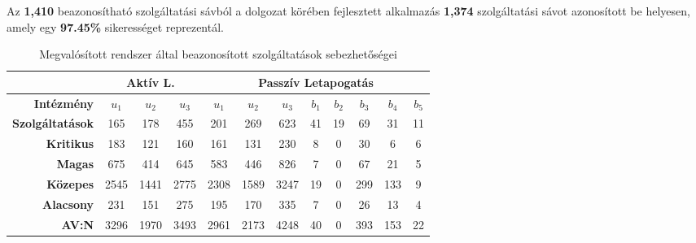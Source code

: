 	Az \textbf{1,410} beazonosítható szolgáltatási sávból a dolgozat körében fejlesztett alkalmazás \textbf{1,374} szolgáltatási sávot azonosított be helyesen, amely egy \textbf{97.45\%} sikerességet reprezentál.
	
	\begin{table}[H]
		\centering
		\begin{tabular}{r|ccc|ccc|ccccc|}
			\cline{2-12}
			\multicolumn{1}{l|}{}                         & \multicolumn{3}{c|}{\textbf{Aktív L.}} & \multicolumn{8}{c|}{\textbf{Passzív Letapogatás}}                                                             \\ \hline
			\multicolumn{1}{|r|}{\textbf{Intézmény}}      & \textbf{$u_1$}    & \textbf{$u_2$}    & \textbf{$u_3$}   & \textbf{$u_1$} & \textbf{$u_2$} & \textbf{$u_3$} & \textbf{$b_1$} & \textbf{$b_2$} & \textbf{$b_3$} & \textbf{$b_4$} & \textbf{$b_5$} \\
			\multicolumn{1}{|r|}{\textbf{Szolgáltatások}} & 165            & 178            & 455           & 201         & 269         & 623         & 41          & 19          & 69          & 31          & 11          \\ \hline
			\multicolumn{1}{|r|}{\textbf{Kritikus}}       & 183            & 121            & 160           & 161         & 131         & 230         & 8           & 0           & 30          & 6           & 6           \\
			\multicolumn{1}{|r|}{\textbf{Magas}}          & 675            & 414            & 645           & 583         & 446         & 826         & 7           & 0           & 67          & 21          & 5           \\
			\multicolumn{1}{|r|}{\textbf{Közepes}}        & 2545           & 1441           & 2775          & 2308        & 1589        & 3247        & 19          & 0           & 299         & 133         & 9           \\
			\multicolumn{1}{|r|}{\textbf{Alacsony}}       & 231            & 151            & 275           & 195         & 170         & 335         & 7           & 0           & 26          & 13          & 4           \\
			\multicolumn{1}{|r|}{\textbf{AV:N}}           & 3296           & 1970           & 3493          & 2961        & 2173        & 4248        & 40          & 0           & 393         & 153         & 22          \\ \hline
		\end{tabular}
		\caption{Megvalósított rendszer által beazonosított szolgáltatások sebezhetőségei}
		\label{cpevulns}
	\end{table}
	
